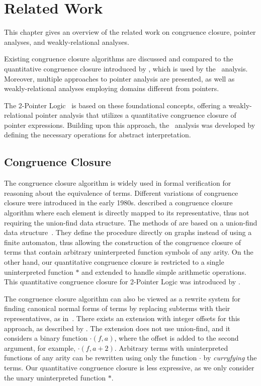 \chapter{Related Work}\label{chapter:related-work}

This chapter gives an overview of the related work on congruence closure, pointer analyses, and weakly-relational analyses.

Existing congruence closure algorithms are discussed and compared to the quantitative congruence closure introduced by \textcite{2pointer},
which is used by the \cpo\ analysis.
Moreover, multiple approaches to pointer analysis are presented, as well as weakly-relational analyses employing domains different from pointers.

The 2-Pointer Logic~\cite{2pointer} is based on these foundational concepts, offering a weakly-relational pointer analysis that utilizes a quantitative congruence closure of pointer expressions.
Building upon this approach, the \cpo\ analysis was developed by defining the necessary operations for abstract interpretation.

\section{Congruence Closure}

The congruence closure algorithm is widely used in formal verification for reasoning about the equivalence of terms.
Different variations of congruence closure were introduced in the early 1980s.
\textcite{cc-tarjan} described a congruence closure algorithm
where each element is directly mapped to its representative, thus not requiring the union-find data structure.
The methods of \textcite{cc-nelson,cc-shostak} are based on a union-find data structure~\cite{uf-tarjan}.
They define the procedure directly on graphs instead of using a finite automaton, thus allowing the construction of the congruence closure of terms that contain arbitrary uninterpreted function symbols of any arity.
On the other hand, our quantitative congruence closure is restricted to a single uninterpreted function $*$ and extended to handle simple arithmetic operations.
This quantitative congruence closure for 2-Pointer Logic was introduced by \textcite{2pointer}.

The congruence closure algorithm can also be viewed as a rewrite system for finding canonical normal forms of terms by replacing subterms with their representatives, as in~\cite{cc-kapur,abstract-cc}.
There exists an extension with integer offsets for this approach, as described by \textcite{cc-offsets}.
The extension does not use union-find, and it considers a binary function $\cdot(f, a)$, where the offset is added to the second argument, for example, $\cdot(f, a + 2)$.
Arbitrary terms with uninterpreted functions of any arity can be rewritten using only the function $\cdot$ by \emph{curryfying} the terms.
Our quantitative congruence closure is less expressive, as we only consider the unary uninterpreted function $*$.

